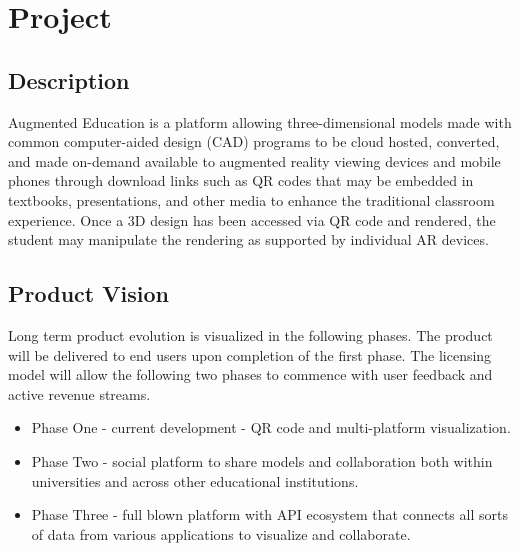 \section{Project}


\subsection{Description}
Augmented Education is a platform allowing three-dimensional models made with common computer-aided design (CAD) programs to be cloud hosted, converted, and made on-demand available to augmented reality viewing devices and mobile phones through download links such as QR codes that may be embedded in textbooks, presentations, and other media to enhance the traditional classroom experience. Once a 3D design has been accessed via QR code and rendered, the student may manipulate the rendering as supported by individual AR devices. 

\subsection{Product Vision}
Long term product evolution is visualized in the following phases. The product will be delivered to end users upon completion of the first phase. The licensing model will allow the following two phases to commence with user feedback and active revenue streams. 

\begin{itemize}
\item Phase One - current development - QR code and multi-platform visualization.
\item Phase Two - social platform to share models and collaboration both within universities and across other educational institutions.
\item Phase Three - full blown platform with API ecosystem that connects all sorts of data from various applications to visualize and collaborate.
\end{itemize}

